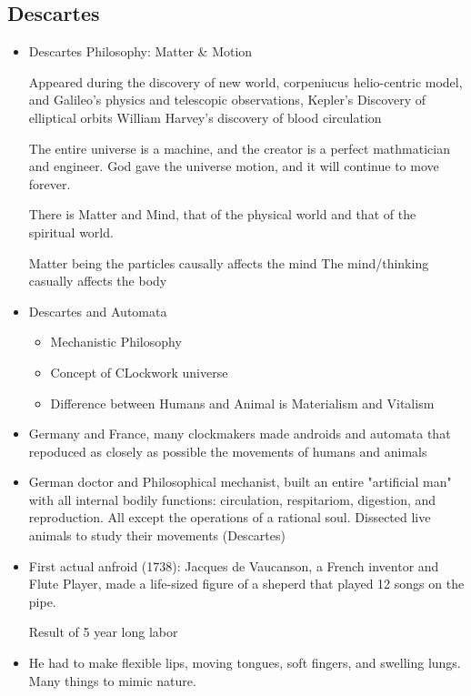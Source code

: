 \documentclass{article}
\begin{document}
\subsection{Descartes}
\begin{itemize}
  \item Descartes Philosophy: Matter \& Motion

    Appeared during the discovery of new world, corpeniucus helio-centric model, and Galileo's
    physics and telescopic observations,
    Kepler's Discovery of elliptical orbits
    William Harvey's discovery of blood circulation

    The entire universe is a machine, and the creator is a perfect mathmatician and engineer.
    God gave the universe motion, and it will continue to move forever.

    There is Matter and Mind, that of the physical world and that of the spiritual world.

    Matter being the particles causally affects the mind
    The mind/thinking casually affects the body
  \item Descartes and Automata
    \begin{itemize}
      \item Mechanistic Philosophy
      \item Concept of CLockwork universe
      \item Difference between Humans and Animal is Materialism and Vitalism
    \end{itemize}
  \item Germany and France, many clockmakers made androids and automata that repoduced
    as closely as possible the movements of humans and animals
  \item German doctor and Philosophical mechanist, built an entire "artificial man"
    with all internal bodily functions: circulation, respitariom, digestion, and reproduction.
    All except the operations of a rational soul. Dissected live animals to study their movements (Descartes)
  \item First actual anfroid (1738): Jacques de Vaucanson, a French inventor and Flute Player,
    made a life-sized figure of a sheperd that played 12 songs on the pipe.

    Result of 5 year long labor
  \item He had to make flexible lips, moving tongues, soft fingers, and swelling lungs.
    Many things to mimic nature.

\end{itemize}
\end{document}
